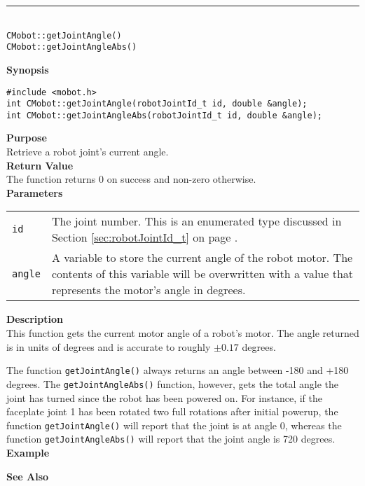 \noindent
\vspace{5pt}
\rule{4.5in}{0.015in}\\
\noindent
{\LARGE \texttt{CMobot::getJointAngle()}}\\
{\LARGE \texttt{CMobot::getJointAngleAbs()}}\\
{}

\noindent
{\bf Synopsis}
\vspace{-8pt}
\begin{verbatim}
#include <mobot.h>
int CMobot::getJointAngle(robotJointId_t id, double &angle);
int CMobot::getJointAngleAbs(robotJointId_t id, double &angle);
\end{verbatim}

\noindent
{\bf Purpose}\\
Retrieve a robot joint's current angle.\\

\noindent
{\bf Return Value}\\
The function returns 0 on success and non-zero otherwise.\\

\noindent
{\bf Parameters}\\
\vspace{-0.1in}
\begin{description}
\item               
\begin{tabular}{p{15 mm}p{145 mm}}
\texttt{id} & The joint number. This is an enumerated type 
discussed in Section \ref{sec:robotJointId_t} on page
\pageref{sec:robotJointId_t}.\\
\texttt{angle} & A variable to store the current angle of the robot
motor. The contents of this variable will be overwritten with a value that
represents the motor's angle in degrees.  \\
\end{tabular}
\end{description}

\noindent
{\bf Description}\\
This function gets the current motor angle of a robot's motor. The
angle returned is in units of degrees and is accurate to roughly $\pm0.17$
degrees. 

The function \texttt{getJointAngle()} always returns an angle between -180 and
+180 degrees. The \texttt{getJointAngleAbs()} function, however, gets the total
angle the joint has turned since the robot has been powered on. For instance, 
if the faceplate joint 1 has been rotated two full rotations after initial powerup,
  the function \texttt{getJointAngle()} will report that the joint is at angle 0,
  whereas the function \texttt{getJointAngleAbs()} will report that the joint
  angle is 720 degrees.
\\

\noindent
{\bf Example}\\
\noindent

\noindent
{\bf See Also}\\


